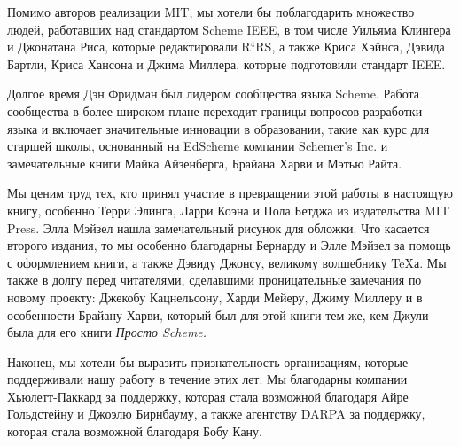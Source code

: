 Помимо авторов реализации MIT, мы хотели бы поблагодарить множество
людей, работавших над стандартом Scheme IEEE, в том числе Уильяма Клингера 
и Джонатана Риса, которые редактировали
R${}^{\mbox{4}}$RS, а также Криса Хэйнса, Дэвида Бартли,
Криса Хансона и Джима Миллера, которые подготовили стандарт
IEEE.

Долгое время Дэн Фридман был лидером сообщества языка
Scheme.  Работа сообщества в более широком плане переходит границы вопросов
разработки языка и включает значительные инновации в образовании,
такие как курс для старшей школы, основанный на EdScheme компании
Schemer's Inc. и замечательные книги Майка Айзенберга, Брайана Харви и 
Мэтью Райта. 

Мы ценим труд тех, кто принял участие в превращении
этой работы в настоящую книгу, особенно Терри Элинга, Ларри
Коэна и Пола Бетджа из издательства MIT Press. Элла Мэйзел нашла
замечательный рисунок для обложки.  Что касается второго издания, то
мы особенно благодарны Бернарду и Элле Мэйзел за помощь с оформлением
книги, а также Дэвиду Джонсу, великому волшебнику \TeX{}а.
Мы также в долгу перед читателями, сделавшими проницательные 
замечания по новому проекту: Джекобу Кацнельсону, Харди Мейеру, Джиму
Миллеру и в особенности Брайану Харви, который был для этой книги
тем же, кем Джули была для его книги {\em Просто
Scheme.}

Наконец, мы хотели бы выразить признательность организациям,
которые поддерживали нашу работу в течение этих лет.  Мы благодарны
компании Хьюлетт-Паккард за поддержку, которая стала возможной благодаря
Айре Гольдстейну и Джоэлю Бирнбауму, а также агентству
DARPA за поддержку, которая стала возможной благодаря Бобу Кану.
